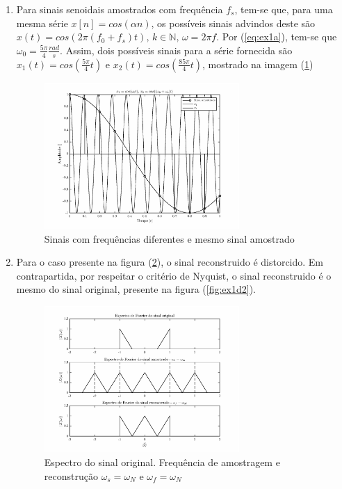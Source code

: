 \documentclass[twoside, fleqn]{article}
\begin{document}
\begin{enumerate}
        \item %
        Para sinais senoidais amostrados com frequência $f_s$, tem-se que, para uma mesma série $x[n] = cos(\alpha n)$, os possíveis sinais advindos deste são $x(t) = cos(2 \pi (f_0 + f_s)t) \mbox{, } k \in \mathbb{N} \mbox{, } \omega = 2 \pi f$. Por (\ref{eq:ex1a}), tem-se que $\omega_0 = \frac{5\pi}{4} \frac{rad}{s}$. Assim, dois possíveis sinais para a série fornecida são $x_1(t) = cos(\frac{5\pi}{4} t )$ e $x_2(t) = cos(\frac{85\pi}{4} t)$, mostrado na imagem (\ref{fig:ex1c}) 
        
            \begin{figure}[H]
            	\center
            	\includegraphics[width=0.7\textwidth]{./images/ex1c.eps}
            	\caption{Sinais com frequências diferentes e mesmo sinal amostrado}
            	\label{fig:ex1c}
            \end{figure}
        
        \item %
        
        Para o caso presente na figura (\ref{fig:ex1d1}), o sinal reconstruido é distorcido. Em contrapartida, por respeitar o critério de Nyquist, o sinal reconstruido é o mesmo do sinal original, presente na figura (\ref{fig:ex1d2}).
        
            \begin{figure}[H]
                \centering
                \includegraphics[width=0.7\textwidth]{./images/ex1d1.eps}
                \caption{Espectro do sinal original. Frequência de amostragem e reconstrução $\omega_s = \omega_N$ e $\omega_f = \omega_N$}
                \label{fig:ex1d1}
            \end{figure}%
        

\end{enumerate}
\end{document}
